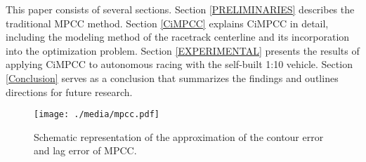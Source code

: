 This paper consists of several sections. Section \ref{PRELIMINARIES} describes the traditional MPCC method. Section \ref{CiMPCC} explains CiMPCC in detail, including the modeling method of the racetrack centerline and its incorporation into the optimization problem. Section \ref{EXPERIMENTAL}  presents the results of applying CiMPCC to autonomous racing with the self-built 1:10 vehicle. Section \ref{Conclusion} serves as a conclusion that summarizes the findings and outlines directions for future research.

\begin{figure}[!t]
	\centering
	\texttt{[image: ./media/mpcc.pdf]}
	\caption{Schematic representation of the approximation of the contour error and lag error of MPCC.}
	\label{fig:mpcc}
\end{figure}